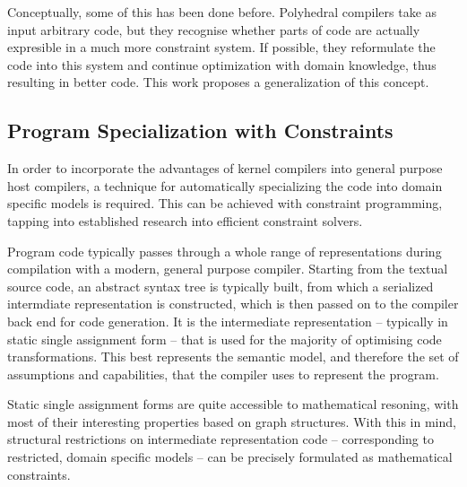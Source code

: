     Conceptually, some of this has been done before.
    Polyhedral compilers take as input arbitrary code, but they recognise whether
    parts of code are actually expresible in a much more constraint system.
    If possible, they reformulate the code into this system and continue
    optimization with domain knowledge, thus resulting in better code.
    This work proposes a generalization of this concept.


\subsection*{Program Specialization with Constraints}

    In order to incorporate the advantages of kernel compilers into general
    purpose host compilers, a technique for automatically specializing the code
    into domain specific models is required.
    This can be achieved with constraint programming, tapping into established
    research into efficient constraint solvers.

    Program code typically passes through a whole range of representations
    during compilation with a modern, general purpose compiler.
    Starting from the textual source code, an abstract syntax tree is typically
    built, from which a serialized intermdiate representation is constructed,
    which is then passed on to the compiler back end for code generation.
    It is the intermediate representation -- typically in static single
    assignment form -- that is used for the majority of optimising code
    transformations.
    This best represents the semantic model, and therefore the set of
    assumptions and capabilities, that the compiler uses to represent the
    program.

    Static single assignment forms are quite accessible to mathematical
    resoning, with most of their interesting properties based on graph
    structures.
    With this in mind, structural restrictions on intermediate representation
    code -- corresponding to restricted, domain specific models -- can be
    precisely formulated as mathematical constraints.

